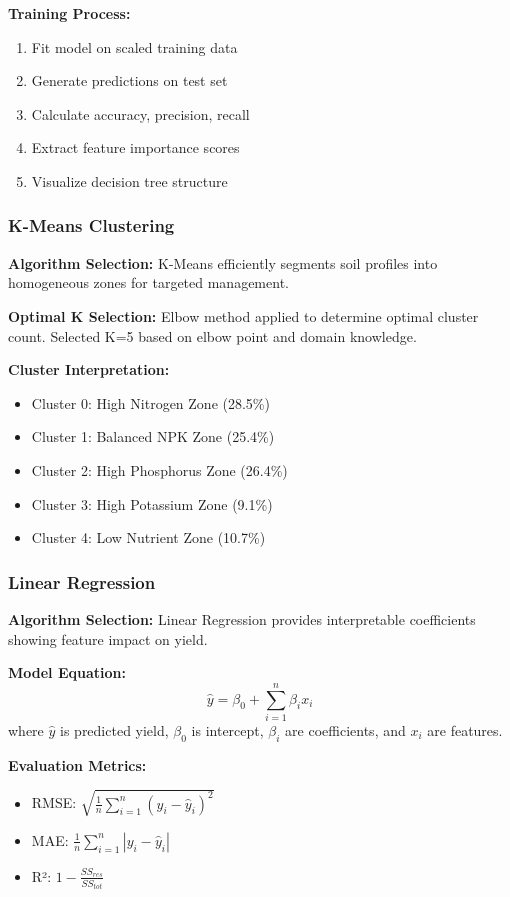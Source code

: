 \documentclass[conference]{IEEEtran}
\begin{document}
\textbf{Training Process:}
\begin{enumerate}
    \item Fit model on scaled training data
    \item Generate predictions on test set
    \item Calculate accuracy, precision, recall
    \item Extract feature importance scores
    \item Visualize decision tree structure
\end{enumerate}

\subsubsection{K-Means Clustering}
\textbf{Algorithm Selection:} K-Means efficiently segments soil profiles into homogeneous zones for targeted management.

\textbf{Optimal K Selection:} Elbow method applied to determine optimal cluster count. Selected K=5 based on elbow point and domain knowledge.

\textbf{Cluster Interpretation:}
\begin{itemize}
    \item Cluster 0: High Nitrogen Zone (28.5\%)
    \item Cluster 1: Balanced NPK Zone (25.4\%)
    \item Cluster 2: High Phosphorus Zone (26.4\%)
    \item Cluster 3: High Potassium Zone (9.1\%)
    \item Cluster 4: Low Nutrient Zone (10.7\%)
\end{itemize}

\subsubsection{Linear Regression}
\textbf{Algorithm Selection:} Linear Regression provides interpretable coefficients showing feature impact on yield.

\textbf{Model Equation:}
\begin{equation}
\hat{y} = \beta_0 + \sum_{i=1}^{n} \beta_i x_i
\end{equation}
where $\hat{y}$ is predicted yield, $\beta_0$ is intercept, $\beta_i$ are coefficients, and $x_i$ are features.

\textbf{Evaluation Metrics:}
\begin{itemize}
    \item RMSE: $\sqrt{\frac{1}{n}\sum_{i=1}^{n}(y_i - \hat{y}_i)^2}$
    \item MAE: $\frac{1}{n}\sum_{i=1}^{n}|y_i - \hat{y}_i|$
    \item R²: $1 - \frac{SS_{res}}{SS_{tot}}$
\end{itemize}
\end{document}
